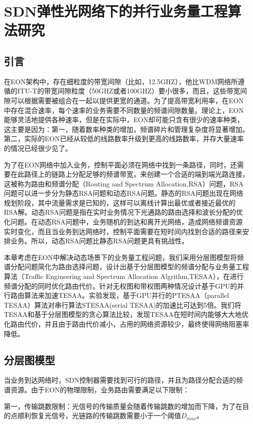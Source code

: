 
\chapter{SDN弹性光网络下的并行业务量工程算法研究}
\section{引言}
在EON架构中，存在细粒度的带宽间隙（比如，12.5GHZ），他比WDM网络所遵循的ITU-T的带宽间隙粒度（50GHZ或者100GHZ）要小很多，而且，这些带宽间隙可以根据需要被组合在一起以提供更宽的通道。为了提高带宽利用率，在EON中存在混合速率，每个速率的业务需要不同数量的频谱间隙数量。理论上，EON能够灵活地提供各种速率，但是在实际中，EON却可能只含有很少的速率种类，这主要是因为：第一，随着数率种类的增加，频谱碎片和管理复杂度将显著增加。第二，实际的EON已经从较低的线路数率升级到更高的线路数率，并存大量速率的情况已经很少见了。

为了在EON网络中加入业务，控制平面必须在网络中找到一条路径，同时，还需要在此路径上的链路上分配足够的频谱带宽，来创建一个合适的端到端光路连接，这被称为路由和频谱分配（Routing and Spectrum Allocation,RSA）问题，RSA问题可以进一步分为静态RSA问题和动态RSA问题。静态的RSA问题出现在网络规划阶段，其中流量需求是已知的，这样可以离线计算出最优或者接近最优的RSA解。动态RSA问题是指在实时业务情况下光通路的路由选择和波长分配的优化问题。在动态RSA问题中，业务随机的到达和离开光网络，造成网络频谱资源实时变化，而且当业务到达网络时，控制平面需要在短时间内找到合适的路径来安排业务。所以，动态RSA问题比静态RSA问题更具有挑战性。

本章考虑在EON中解决动态场景下的业务量工程问题，我们采用分层图模型将频谱分配问题简化为路由选择问题，设计出基于分层图模型的频谱分配与业务量工程算法（Traffic Engineering and Spectrum Allocation Algrithm,TESAA），在进行频谱分配的同时优化路由代价。针对无权图和带权图两种情况设计基于GPU的并行路由算法来加速TESAA。实验发现，基于GPU并行的PTESAA（parallel TESAA）算法对串行算法STESAA(serial TESAA)的加速比可达到5倍。我们将TESAA和基于分层图模型的贪心算法比较，发现TESAA在短时间内能够大大地优化路由代价，并且由于路由代价减小，占用的网络资源较少，最终使得网络阻塞率降低。
\section{分层图模型}
当业务到达网络时，SDN控制器需要找到可行的路径，并且为路径分配合适的频谱资源。由于EON的物理限制，业务路由需要满足以下限制：

第一，传输跳数限制：光信号的传输质量会随着传输跳数的增加而下降，为了在目的点顺利恢复光信号，光链路的传输跳数需要小于一个阈值$D_{max}$。

